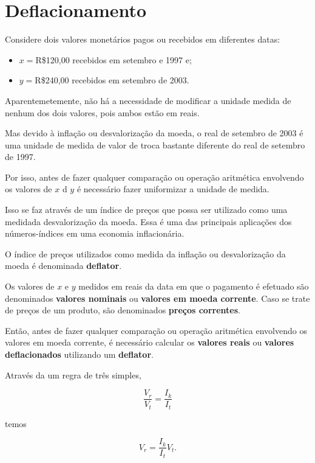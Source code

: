 \documentclass[
]{book}
\begin{document}
\hypertarget{deflacionamento}{%
\section{Deflacionamento}\label{deflacionamento}}

Considere dois valores monetários pagos ou recebidos em diferentes datas:

\begin{itemize}
\item
  \(x=\)R\$120,00 recebidos em setembro e 1997 e;
\item
  \(y=\)R\$240,00 recebidos em setembro de 2003.
\end{itemize}

Aparentemetemente, não há a necessidade de modificar a unidade medida de nenhum dos dois valores, pois ambos estão em reais.

Mas devido à inflação ou desvalorização da moeda, o real de setembro de 2003 é uma unidade de medida de valor de troca bastante diferente do real de setembro de 1997.

Por isso, antes de fazer qualquer comparação ou operação aritmética envolvendo os valores de \(x\) d \(y\) é necessário fazer uniformizar a unidade de medida.

Isso se faz através de um índice de preços que possa ser utilizado como uma medidada desvalorização da moeda. Essa é uma das principais aplicações dos números-índices em uma economia inflacionária.

O índice de preços utilizados como medida da inflação ou desvalorização da moeda é denominada \textbf{deflator}.

Os valores de \(x\) e \(y\) medidos em reais da data em que o pagamento é efetuado são denominados \textbf{valores nominais} ou \textbf{valores em moeda corrente}. Caso se trate de preços de um produto, são denominados \textbf{preços correntes}.

Então, antes de fazer qualquer comparação ou operação aritmética envolvendo os valores em moeda corrente, é necessário calcular os \textbf{valores reais} ou \textbf{valores deflacionados} utilizando um \textbf{deflator}.

Através da um regra de três simples,

\begin{equation}
  \frac{V_r}{V_t} = \frac{I_k}{I_t}
\end{equation}

temos

\begin{equation}
  V_r = \frac{I_k}{I_t}V_t.
  \label{eq:ValorReal}
\end{equation}
\end{document}
